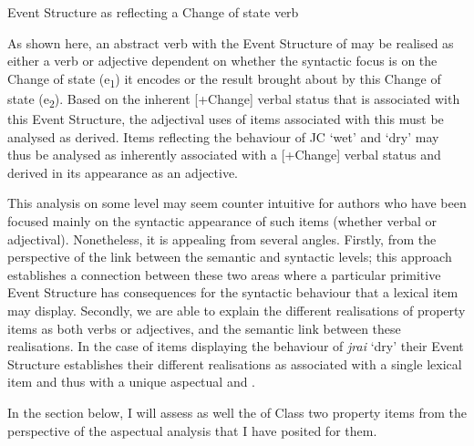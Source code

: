 \ea%
\label{ex:6:4}

 Event Structure as reflecting a Change of state verb 
\begin{center}\end{center}
\z

As shown here, an abstract verb with the Event Structure of  may be realised as either a verb or adjective dependent on whether the syntactic focus is on the Change of state (e\textsubscript{1}) it encodes or the result brought about by this Change of state (e\textsubscript{2}). Based on the inherent [+Change] verbal status that is associated with this Event Structure, the adjectival uses of items associated with this  must be analysed as derived. Items reflecting the behaviour of JC `wet' and `dry' may thus be analysed as inherently associated with a [+Change] verbal status and derived in its appearance as an adjective.

This analysis on some level may seem counter intuitive for authors who have been focused mainly on the syntactic appearance of such items (whether verbal or adjectival). Nonetheless, it is appealing from several angles. Firstly, from the perspective of the link between the semantic and syntactic levels; this approach establishes a connection between these two areas where a particular primitive Event Structure has consequences for the syntactic behaviour that a lexical item may display. Secondly, we are able to explain the different realisations of property items as both verbs or adjectives, and the semantic link between these realisations. In the case of items displaying the behaviour of \textit{jrai} `dry' their Event Structure establishes their different realisations as associated with a single lexical item and thus with a unique aspectual and . 

In the section below, I will assess as well the  of Class two property items from the perspective of the aspectual analysis that I have posited for them. 

